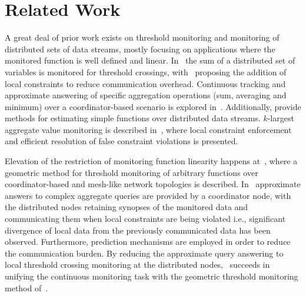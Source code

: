 \chapter{Related Work} \label{chap:relWork}

A great deal of prior work exists on threshold monitoring and monitoring of distributed sets of data streams, mostly focusing on applications where the monitored function is well defined and linear. In~\cite{DilmanReactiveMonitoring} the sum of a distributed set of variables is monitored for threshold crossings, with~\cite{KeralapuraCommEfficientThresholdCounts} proposing the addition of local constraints to reduce communication overhead. Continuous tracking and approximate answering of specific aggregation operations (sum, averaging and minimum) over a coordinator-based scenario is explored in~\cite{OlstonAdaptiveFiltersContQueries}. Additionally, \cite{GibbonsSimpleFuncEstimationOverUnion, GibbonsDistrStreamAlgosSlidingWindows} provide methods for estimating simple functions over distributed data streams. $k$-largest aggregate value monitoring is described in~\cite{BabcockDistributedTopk}, where local constraint enforcement and efficient resolution of false constraint violations is presented.

Elevation of the restriction of monitoring function linearity happens at~\cite{Sharfman2006GM}, where a geometric method for threshold monitoring of arbitrary functions over coordinator-based and mesh-like network topologies is described. In~\cite{CormodeApproxContQueryingDistrStreams} approximate answers to complex aggregate queries are provided by a coordinator node, with the distributed nodes retaining synopses of the monitored data and communicating them when local constraints are being violated i.e., significant divergence of local data from the previously communicated data has been observed. Furthermore, prediction mechanisms are employed in order to reduce the communication burden. By reducing the approximate query answering to local threshold crossing monitoring at the distributed nodes,~\cite{Garofalakis2013SketchBasedGM} succeeds in unifying the continuous monitoring task with the geometric threshold monitoring method of~\cite{Sharfman2006GM}.

